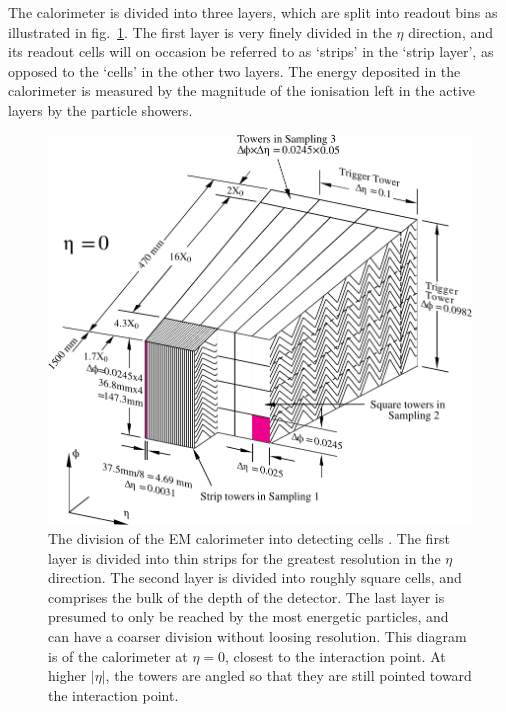 The calorimeter is divided into three layers, which are split into readout bins as illustrated in fig.~\ref{caldiv}. The first layer is very finely divided in the $\eta$ direction, and its readout cells will on occasion be referred to as `strips' in the `strip layer', as opposed to the `cells' in the other two layers. The energy deposited in the calorimeter is measured by the magnitude of the ionisation left in the active layers by the particle showers.

\begin{figure}[htp]
\begin{minipage}[b]{.69\textwidth}
\includegraphics[width=\textwidth]{caldiv}
\end{minipage}
\begin{minipage}[b]{.3\textwidth}
\caption{The division of the EM calorimeter into detecting cells \cite{egede}. The first layer is divided into thin strips for the greatest resolution in the $\eta$ direction. The second layer is divided into roughly square cells, and comprises the bulk of the depth of the detector. The last layer is presumed to only be reached by the most energetic particles, and can have a coarser division without loosing resolution. This diagram is of the calorimeter at $\eta = 0$, closest to the interaction point. At higher $|\eta|$, the towers are angled so that they are still pointed toward the interaction point.
\label{caldiv}}
\end{minipage}
\end{figure}


